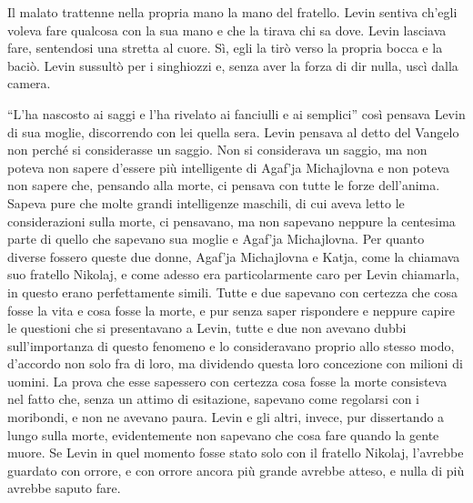 Il malato trattenne nella propria mano la mano del fratello. Levin sentiva ch'egli voleva fare qualcosa con la sua mano e che la tirava chi sa dove. Levin lasciava fare, sentendosi una stretta al cuore. Sì, egli la tirò verso la propria bocca e la baciò. Levin sussultò per i singhiozzi e, senza aver la forza di dir nulla, uscì dalla camera. 

\label{xix-4} 

``L'ha nascosto ai saggi e l'ha rivelato ai fanciulli e ai semplici'' così pensava Levin di sua moglie, discorrendo con lei quella sera. Levin pensava al detto del Vangelo non perché si considerasse un saggio. Non si considerava un saggio, ma non poteva non sapere d'essere più intelligente di Agaf'ja Michajlovna e non poteva non sapere che, pensando alla morte, ci pensava con tutte le forze dell'anima. Sapeva pure che molte grandi intelligenze maschili, di cui aveva letto le considerazioni sulla morte, ci pensavano, ma non sapevano neppure la centesima parte di quello che sapevano sua moglie e Agaf'ja Michajlovna. Per quanto diverse fossero queste due donne, Agaf'ja Michajlovna e Katja, come la chiamava suo fratello Nikolaj, e come adesso era particolarmente caro per Levin chiamarla, in questo erano perfettamente simili. Tutte e due sapevano con certezza che cosa fosse la vita e cosa fosse la morte, e pur senza saper rispondere e neppure capire le questioni che si presentavano a Levin, tutte e due non avevano dubbi sull'importanza di questo fenomeno e lo consideravano proprio allo stesso modo, d'accordo non solo fra di loro, ma dividendo questa loro concezione con milioni di uomini. La prova che esse sapessero con certezza cosa fosse la morte consisteva nel fatto che, senza un attimo di esitazione, sapevano come regolarsi con i moribondi, e non ne avevano paura. Levin e gli altri, invece, pur dissertando a lungo sulla morte, evidentemente non sapevano che cosa fare quando la gente muore. Se Levin in quel momento fosse stato solo con il fratello Nikolaj, l'avrebbe guardato con orrore, e con orrore ancora più grande avrebbe atteso, e nulla di più avrebbe saputo fare. 

